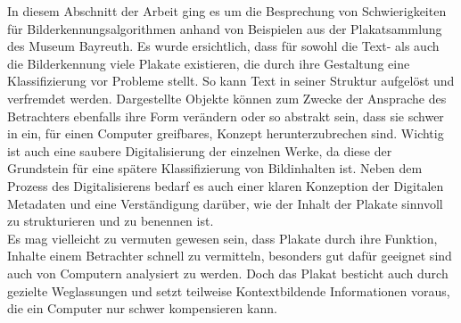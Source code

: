 \documentclass[a4paper,12pt,ngerman]{article}
\begin{document}
In diesem Abschnitt der Arbeit ging es um die Besprechung von Schwierigkeiten für Bilderkennungsalgorithmen anhand von Beispielen aus der Plakatsammlung des Museum Bayreuth. Es wurde ersichtlich, dass für sowohl die Text- als auch die Bilderkennung viele Plakate existieren, die durch ihre Gestaltung eine Klassifizierung vor Probleme stellt. So kann Text in seiner Struktur aufgelöst und verfremdet werden. Dargestellte Objekte können zum Zwecke der Ansprache des Betrachters ebenfalls ihre Form verändern oder so abstrakt sein, dass sie schwer in ein, für einen Computer greifbares, Konzept herunterzubrechen sind. Wichtig ist auch eine saubere Digitalisierung der einzelnen Werke, da diese der Grundstein für eine spätere Klassifizierung von Bildinhalten ist. Neben dem Prozess des Digitalisierens bedarf es auch einer klaren Konzeption der Digitalen Metadaten und eine Verständigung darüber, wie der Inhalt der Plakate sinnvoll zu strukturieren und zu benennen ist. \\
Es mag vielleicht zu vermuten gewesen sein, dass Plakate durch ihre Funktion, Inhalte einem Betrachter schnell zu vermitteln, besonders gut dafür geeignet sind auch von Computern analysiert zu werden. Doch das Plakat besticht auch durch gezielte Weglassungen und setzt teilweise Kontextbildende Informationen voraus, die ein Computer nur schwer kompensieren kann. \\
\end{document}
